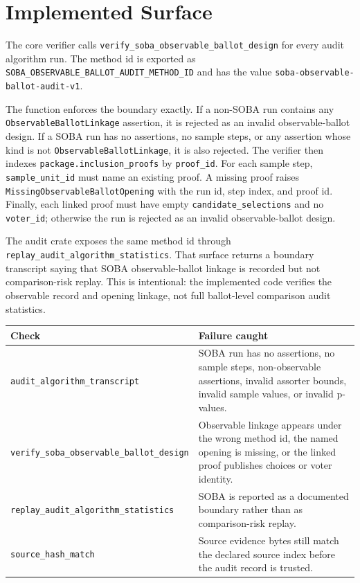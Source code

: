 \section{Implemented Surface}

The core verifier calls
\texttt{verify\_soba\_observable\_ballot\_design} for every audit algorithm
run. The method id is exported as
\texttt{SOBA\_OBSERVABLE\_BALLOT\_AUDIT\_METHOD\_ID} and has the value
\texttt{soba-observable-ballot-audit-v1}.

The function enforces the boundary exactly. If a non-SOBA run contains any
\texttt{ObservableBallotLinkage} assertion, it is rejected as an invalid
observable-ballot design. If a SOBA run has no assertions, no sample steps, or
any assertion whose kind is not \texttt{ObservableBallotLinkage}, it is also
rejected. The verifier then indexes \texttt{package.inclusion\_proofs} by
\texttt{proof\_id}. For each sample step, \texttt{sample\_unit\_id} must name
an existing proof. A missing proof raises
\texttt{MissingObservableBallotOpening} with the run id, step index, and proof
id. Finally, each linked proof must have empty \texttt{candidate\_selections}
and no \texttt{voter\_id}; otherwise the run is rejected as an invalid
observable-ballot design.

The audit crate exposes the same method id through
\texttt{replay\_audit\_algorithm\_statistics}. That surface returns a boundary
transcript saying that SOBA observable-ballot linkage is recorded but not
comparison-risk replay. This is intentional: the implemented code verifies the
observable record and opening linkage, not full ballot-level comparison audit
statistics.

\begin{center}
\small
\begin{tabularx}{\textwidth}{lX}
\toprule
Check & Failure caught \\
\midrule
\texttt{audit\_algorithm\_transcript} & SOBA run has no assertions, no sample steps, non-observable assertions, invalid assorter bounds, invalid sample values, or invalid p-values. \\
\texttt{verify\_soba\_observable\_ballot\_design} & Observable linkage appears under the wrong method id, the named opening is missing, or the linked proof publishes choices or voter identity. \\
\texttt{replay\_audit\_algorithm\_statistics} & SOBA is reported as a documented boundary rather than as comparison-risk replay. \\
\texttt{source\_hash\_match} & Source evidence bytes still match the declared source index before the audit record is trusted. \\
\bottomrule
\end{tabularx}
\end{center}
